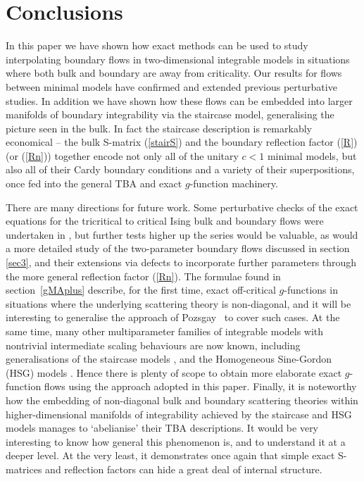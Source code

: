 \documentclass[11pt]{article}
\newcommand{\resection}[1]{\setcounter{equation}{0}\section{#1}}
\begin{document}

\resection{Conclusions}
%
In this paper we have shown how exact methods can be used to study
interpolating boundary flows in two-dimensional integrable models in
situations where both bulk and boundary are away from criticality. 
Our results for flows between minimal models
have confirmed and extended previous perturbative
studies. In addition we have shown how these flows can be embedded
into
larger manifolds of boundary integrability via the staircase model,
generalising the picture seen in the bulk. In fact the staircase 
description is remarkably economical -- the bulk S-matrix
(\ref{stairS}) and the boundary reflection factor (\ref{R}) (or
(\ref{Rn})) together encode not only all of the unitary $c<1$
minimal models, but also all of their Cardy boundary conditions and a
variety of their superpositions, once
fed into the general TBA and exact $g$-function machinery.

There are many directions for future work. Some perturbative checks 
of the exact equations for
the tricritical to critical Ising bulk and boundary flows were
undertaken in \cite{Dorey:2009vg}, but further tests higher up the
series would be valuable, as would a more detailed study of the
two-parameter boundary flows discussed in section \ref{sec3}, and
their extensions via defects to incorporate further parameters through
the more general reflection factor (\ref{Rn}).  
The formulae found in section~\ref{gMAplus}
describe, for the first time, exact off-critical $g$-functions
in situations where the underlying scattering theory is
non-diagonal, and it will be interesting to generalise the approach of
Pozsgay~\cite{Pozsgay:2010tv} to cover such cases. At the same time, 
many other multiparameter families of integrable models
with nontrivial intermediate scaling behaviours 
are now known, including generalisations of the staircase models 
\cite{Martins:1992ht,Dorey:1992bq,Martins:1992sx,Dorey:1992pj}, and
the Homogeneous Sine-Gordon (HSG) models 
\cite{FernandezPousa:1996hi,CastroAlvaredo:1999em,Dorey:2004qc}.
Hence there is plenty of scope to obtain more elaborate
exact $g$-function flows using the approach adopted in this paper. 
Finally, it is noteworthy how the embedding of non-diagonal bulk and 
boundary scattering theories within higher-dimensional manifolds of 
integrability achieved by the staircase and HSG models manages to
`abelianise' their TBA descriptions. It would be very interesting to
know how general this phenomenon is, and to understand it at a deeper
level. At the very least, it demonstrates once again that simple
exact S-matrices and reflection factors
can hide a great deal of internal structure.
\end{document}
